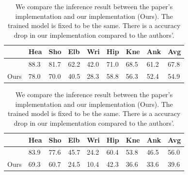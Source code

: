 \documentclass[10pt,twocolumn,letterpaper]{article}
\begin{document}
\begin{table}
  \begin{center}
    \begin{tabular}{|p{0.8cm}|p{0.5cm}|p{0.5cm}|p{0.5cm}|p{0.5cm}|p{0.5cm}|p{0.5cm}|p{0.5cm}||p{0.5cm}|}
      \hline
                              	 & Hea  & Sho  & Elb  & Wri  & Hip  & Kne  & Ank  & Avg  \\ \hline
      \hline
      \cite{Yang_PAMI2011} 	 & 88.3 & 81.7 & 62.2 & 42.0 & 71.0 & 68.5 & 61.2 & 67.8 \\ \hline
      Ours                    	 & 78.0 & 70.0 & 40.5 & 28.3 & 58.8 & 56.3 & 52.4 & 54.9 \\ \hline
    \end{tabular}
    \caption*{(a) Probability of correct keypoints (PCK)}
    \bigskip
    \begin{tabular}{|p{0.8cm}|p{0.5cm}|p{0.5cm}|p{0.5cm}|p{0.5cm}|p{0.5cm}|p{0.5cm}|p{0.5cm}||p{0.5cm}|}
      \hline
      	                      	 & Hea  & Sho  & Elb  & Wri  & Hip  & Kne  & Ank  & Avg \\ \hline
      \hline
      \cite{Yang_PAMI2011} 	 & 83.9 & 77.6 & 45.7 & 24.2 & 60.4 & 53.8 & 46.5 & 56.0 \\ \hline
      Ours                   	 & 69.3 & 60.7 & 24.5 & 10.4 & 42.3 & 36.6 & 33.6 & 39.6 \\ \hline
    \end{tabular}
    \caption*{(b) Average precision of keypoints (APK)}
  \end{center}
  \caption{We compare the inference result between the paper's implementation \cite{Yang_PAMI2011} and our implementation (Ours). The trained model is fixed to be the same. There is a accuracy drop in our implementation compared to the authors'.}
  \label{tab:parse_inf}
\end{table}
\end{document}
